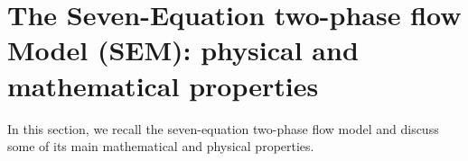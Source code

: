 \documentclass[preprint,10pt]{elsarticle}
\begin{document}
%

\section{The Seven-Equation two-phase flow Model (SEM): physical and mathematical properties}\label{sec:7-equ-model}
%
In this section, we recall the seven-equation two-phase flow model and discuss some of its main mathematical and physical properties.
%
\end{document}
